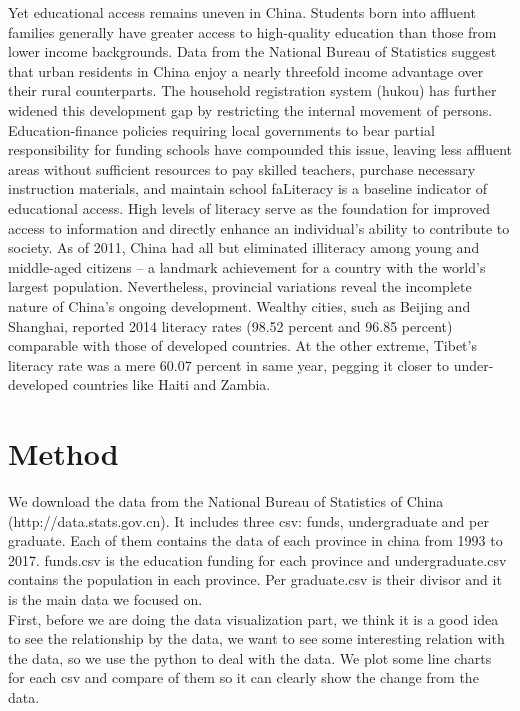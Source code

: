 \noindent Yet educational access remains uneven in China. Students born into affluent families generally have greater access to high-quality education than those from lower income backgrounds.\cite{rong2001inequality} Data from the National Bureau of Statistics suggest that urban residents in China enjoy a nearly threefold income advantage over their rural counterparts. The household registration system (hukou) has further widened this development gap by restricting the internal movement of persons.  Education-finance policies requiring local governments to bear partial responsibility for funding schools have compounded this issue, leaving less affluent areas without sufficient resources to pay skilled teachers, purchase necessary instruction materials, and maintain school faLiteracy is a baseline indicator of educational access. High levels of literacy serve as the foundation for improved access to information and directly enhance an individual’s ability to contribute to society.  As of 2011, China had all but eliminated illiteracy among young and middle-aged citizens – a landmark achievement for a country with the world’s largest population. Nevertheless, provincial variations reveal the incomplete nature of China’s ongoing development. Wealthy cities, such as Beijing and Shanghai, reported 2014 literacy rates (98.52 percent and 96.85 percent) comparable with those of developed countries.\cite{tsang1996financial} At the other extreme, Tibet’s literacy rate was a mere 60.07 percent in same year, pegging it closer to under-developed countries like Haiti and Zambia.

\section{Method}
We download the data from the National Bureau of Statistics of China (http://data.stats.gov.cn). It includes three csv: funds, undergraduate and per graduate. Each of them contains the data of each province in china from 1993 to 2017. funds.csv is the education funding for each province and undergraduate.csv contains the population in each province. Per graduate.csv is their divisor and it is the main data we focused on.\\

\noindent First, before we are doing the data visualization part, we think it is a good idea to see the relationship by the data, we want to see some interesting relation with the data, so we use the python to deal with the data. \cite{yu1977exploratory}We plot some line charts for each csv and compare of them so it can clearly show the change from the data.\cite{pedregosa2011scikit}\\

